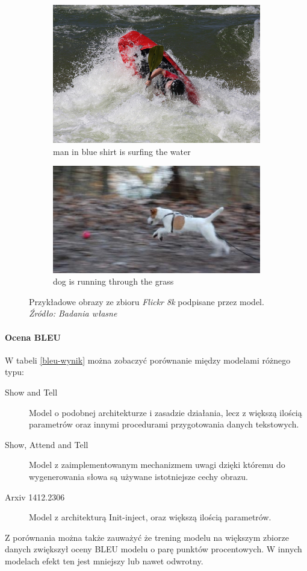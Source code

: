 \begin{figure}[h]
\begin{subfigure}[b]{.45\linewidth}
	\includegraphics[width=\linewidth]{./files/red_kayak.jpg}
	\caption{man in blue shirt is surfing the water}
\end{subfigure}
\begin{subfigure}[b]{.45\linewidth}
	\includegraphics[width=\linewidth]{./files/dog_in_forest.jpg}
	\caption{dog is running through the grass}
\end{subfigure}
\caption{Przykładowe obrazy ze zbioru \textit{Flickr 8k} podpisane przez model. \textit{Źródło: Badania własne}}
\label{examples}
\end{figure}

\paragraph{Ocena BLEU}
W tabeli \ref{bleu-wynik} można zobaczyć porównanie między modelami różnego typu: 
\begin{description}
\item[Show and Tell] Model o podobnej architekturze i zasadzie działania, lecz z większą ilością parametrów oraz innymi procedurami przygotowania danych tekstowych.
\item[Show, Attend and Tell] Model z zaimplementowanym mechanizmem uwagi dzięki któremu do wygenerowania słowa są używane istotniejsze cechy obrazu.
\item[Arxiv 1412.2306] Model z architekturą Init-inject, oraz większą ilością parametrów.
\end{description}
Z porównania można także zauważyć że trening modelu na większym zbiorze danych zwiększył oceny BLEU modelu o parę punktów procentowych. W innych modelach efekt ten jest mniejszy lub nawet odwrotny. 

